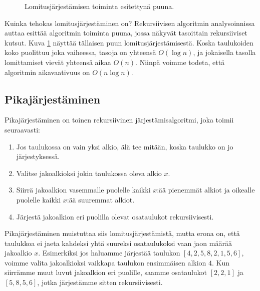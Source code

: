 \begin{figure}
\center
{}
\caption{Lomitusjärjestämisen toiminta esitettynä puuna.}
\label{fig:lomjar}
\end{figure}

Kuinka tehokas lomitusjärjestäminen on?
Rekursiivisen algoritmin analysoinnissa auttaa esittää
algoritmin toiminta puuna,
jossa näkyvät tasoittain rekursiiviset kutsut.
Kuva \ref{fig:lomjar} näyttää tällaisen puun lomitusjärjestämisestä.
Koska taulukoiden koko puolittuu joka vaiheessa,
tasoja on yhteensä $O(\log n)$,
ja jokaisella tasolla lomittamiset vievät yhteensä aikaa $O(n)$.
Niinpä voimme todeta, että algoritmin aikavaativuus on $O(n \log n)$.

\subsection{Pikajärjestäminen}

Pikajärjestäminen on toinen rekursiivinen järjestämisalgoritmi,
joka toimii seuraavasti:

\begin{enumerate}
\item Jos taulukossa on vain yksi alkio,
älä tee mitään, koska taulukko on jo järjestyksessä.
\item Valitse jakoalkioksi jokin taulukossa oleva alkio $x$.
\item Siirrä jakoalkion vasemmalle puolelle kaikki $x$:ää pienemmät alkiot
ja oikealle puolelle kaikki $x$:ää suuremmat alkiot.
\item Järjestä jakoalkion eri puolilla olevat osataulukot rekursiivisesti.
\end{enumerate}

Pikajärjestäminen muistuttaa siis lomitusjärjestämistä,
mutta erona on, että taulukkoa ei jaeta kahdeksi yhtä suureksi
osataulukoksi vaan jaon määrää jakoalkio $x$.
Esimerkiksi jos haluamme järjestää taulukon $[4,2,5,8,2,1,5,6]$,
voimme valita jakoalkioksi vaikkapa taulukon ensimmäisen alkion $4$.
Kun siirrämme muut luvut jakoalkion eri puolille,
saamme osataulukot $[2,2,1]$ ja $[5,8,5,6]$, jotka järjestämme
sitten rekursiivisesti.

